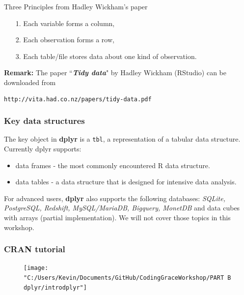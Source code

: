 \documentclass{beamer}
\begin{document}
\begin{frame}[fragile]
\begin{framed}
	\noindent Three Principles from Hadley Wickham's paper
	\begin{itemize}
		\item[1.] Each variable forms a column, 
		\item[2.] Each observation forms a row, 
		\item[3.] Each table/file stores data about one kind of observation.
	\end{itemize}
\end{framed}
\noindent \textbf{Remark:}  The paper ``\textit{\textbf{Tidy data}}" by Hadley Wickham (RStudio) can be downloaded from 
\begin{verbatim}
http://vita.had.co.nz/papers/tidy-data.pdf
\end{verbatim}
\end{frame}
\begin{frame}
\frametitle{Key data structures}

The key object in \textbf{dplyr} is a \texttt{tbl}, a representation of a tabular data structure. Currently dplyr supports:

\begin{itemize}
	\item data frames - the  most commonly encountered R data structure. 
	\item data tables - a data structure that is designed for intensive data analysis.
\end{itemize}

\end{frame}
\begin{frame}
\noindent For advanced users, \textbf{dplyr} also supports the following databases: \textit{SQLite, PostgreSQL, Redshift, MySQL/MariaDB, Bigquery, MonetDB} and data cubes with arrays (partial implementation). We will not cover those topics in this workshop.
\end{frame}
\begin{frame}
	\frametitle{CRAN tutorial}
\begin{figure}
\centering
\texttt{[image: "C:/Users/Kevin/Documents/GitHub/CodingGraceWorkshop/PART B dplyr/introdplyr"]}

\end{figure}

\end{frame}
\end{document}
